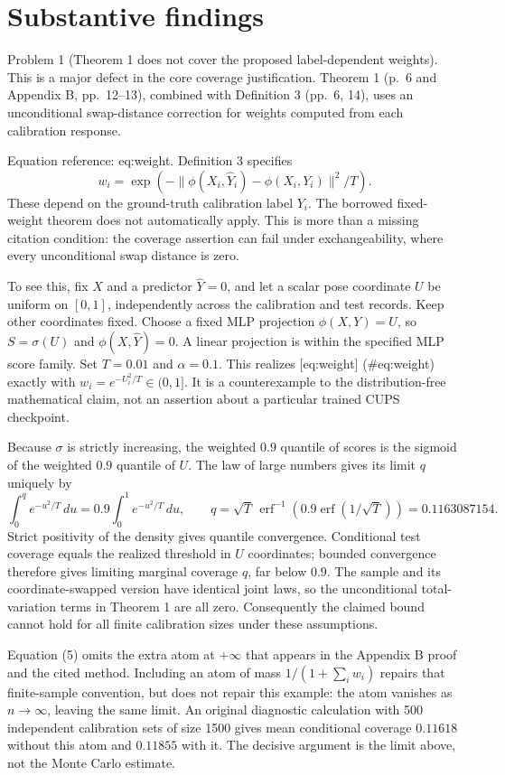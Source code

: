 \documentclass[10pt]{article}
\begin{document}
\section*{Substantive findings}
Problem 1 (Theorem 1 does not cover the proposed label-dependent weights).  This is a major defect in the core coverage justification. Theorem 1 (p. 6 and Appendix B, pp. 12–13), combined with Definition 3 (pp. 6, 14), uses an unconditional swap-distance correction for weights computed from each calibration response.\par
Equation reference: eq:weight. Definition 3 specifies \[
 w_i=\exp(-\|\phi(X_i,\widehat Y_i)-\phi(X_i,Y_i)\|^2/T).\] These depend on the ground-truth calibration label \(Y_i\). The borrowed fixed-weight theorem does not automatically apply. This is more than a missing citation condition: the coverage assertion can fail under exchangeability, where every unconditional swap distance is zero.\par
To see this, fix \(X\) and a predictor \(\widehat Y=0\), and let a scalar pose coordinate \(U\) be uniform on \([0,1]\), independently across the calibration and test records. Keep other coordinates fixed. Choose a fixed MLP projection \(\phi(X,Y)=U\), so \(S=\sigma(U)\) and \(\phi(X,\widehat Y)=0\). A linear projection is within the specified MLP score family. Set \(T=0.01\) and \(\alpha=0.1\). This realizes [eq:weight] (\#eq:weight) exactly with \(w_i=e^{-U_i^2/T}\in(0,1]\). It is a counterexample to the distribution-free mathematical claim, not an assertion about a particular trained CUPS checkpoint.\par
Because \(\sigma\) is strictly increasing, the weighted \(0.9\) quantile of scores is the sigmoid of the weighted \(0.9\) quantile of \(U\). The law of large numbers gives its limit \(q\) uniquely by \[\int_0^q e^{-u^2/T}\,du
 =0.9\int_0^1e^{-u^2/T}\,du,
 \qquad
 q=\sqrt T\,\operatorname{erf}^{-1}
       (0.9\operatorname{erf}(1/\sqrt T))=0.1163087154.\] Strict positivity of the density gives quantile convergence. Conditional test coverage equals the realized threshold in \(U\) coordinates; bounded convergence therefore gives limiting marginal coverage \(q\), far below \(0.9\). The sample and its coordinate-swapped version have identical joint laws, so the unconditional total-variation terms in Theorem 1 are all zero. Consequently the claimed bound cannot hold for all finite calibration sizes under these assumptions.\par
Equation (5) omits the extra atom at \(+\infty\) that appears in the Appendix B proof and the cited method. Including an atom of mass \(1/(1+\sum_iw_i)\) repairs that finite-sample convention, but does not repair this example: the atom vanishes as \(n\to\infty\), leaving the same limit. An original diagnostic calculation with 500 independent calibration sets of size 1500 gives mean conditional coverage \(0.11618\) without this atom and \(0.11855\) with it. The decisive argument is the limit above, not the Monte Carlo estimate.\par
\end{document}
